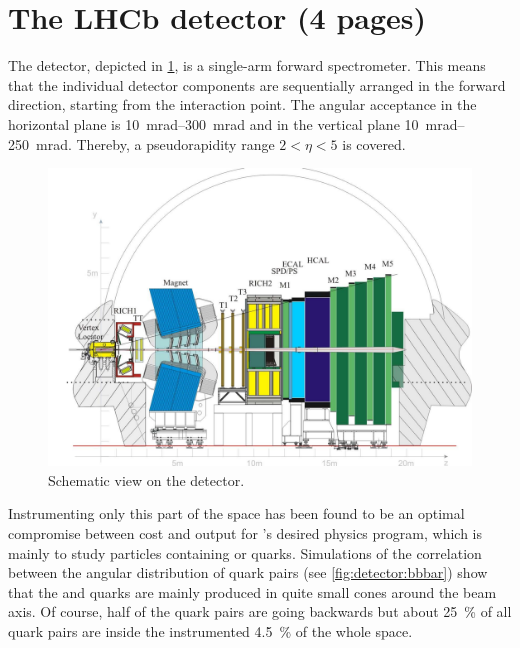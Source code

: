 
\newpage

\section{The LHCb detector (4 pages)}
\label{sec:detector:lhcb}

The \lhcb detector, depicted in \cref{fig:detector:scheme}, is a single-arm
forward spectrometer. This means that the individual detector
components are sequentially arranged in the forward direction, starting from
the interaction point. The angular acceptance in the horizontal plane is
\SIrange{10}{300}{mrad} and in the vertical plane \SIrange{10}{250}{mrad}.
Thereby, a pseudorapidity range $2<\eta <5$ is covered.
\begin{figure}[htb]
\centering
\includegraphics[width=\textwidth]{04-Detector/figs/Lhcbdetektor.pdf}
\caption{Schematic view on the \lhcb detector\cite{Alves:2008zz}.}
\label{fig:detector:scheme}
\end{figure}
Instrumenting only this part of the space has been found to be an optimal
compromise between cost and output for \lhcb's desired physics program, which
is mainly to study particles containing \bquark or \cquark quarks. Simulations
of the correlation between the angular distribution of \bbbar quark pairs (see
\cref{fig:detector:bbbar}) show that the \bquark and \bquarkbar quarks are
mainly produced in quite small cones around the beam axis. Of course, half of
the \bbbar quark pairs are going backwards but about \SI{25}{\percent} of all
\bbbar quark pairs are inside the instrumented \SI{4.5}{\percent} of the whole
space.
